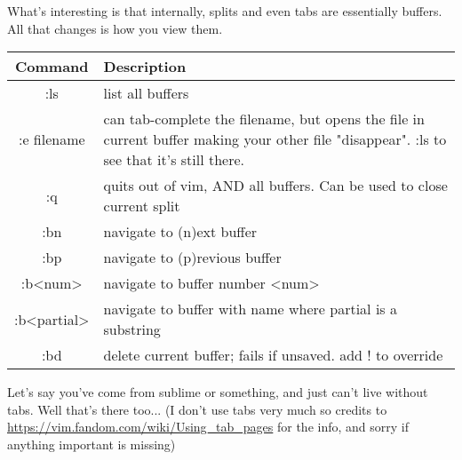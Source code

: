 \documentclass[12pt, letterpaper]{article}
\begin{document}
What's interesting is that internally, splits and even tabs are essentially buffers. All that changes is how you view them.

\begin{table}[H]
    \begin{tabular}{|c|p{9cm}|}
        Command & Description \\
        \hline
        :ls & list all buffers \\
        \hline
        :e filename & can tab-complete the filename, but opens the file in current buffer making your other file "disappear". :ls to see that it's still there. \\
        \hline
        :q & quits out of vim, AND all buffers. Can be used to close current split \\
        \hline
        :bn & navigate to (n)ext buffer \\
        \hline
        :bp & navigate to (p)revious buffer \\
        \hline
        :b<num> & navigate to buffer number <num> \\
        \hline
        :b<partial> & navigate to buffer with name where partial is a substring \\
        \hline
        :bd & delete current buffer; fails if unsaved. add ! to override \\
        \hline
    \end{tabular}
\end{table}


Let's say you've come from sublime or something, and just can't live without tabs. Well that's there too... (I don't use tabs very much so credits to \url{https://vim.fandom.com/wiki/Using_tab_pages} for the info, and sorry if anything important is missing)
\end{document}
